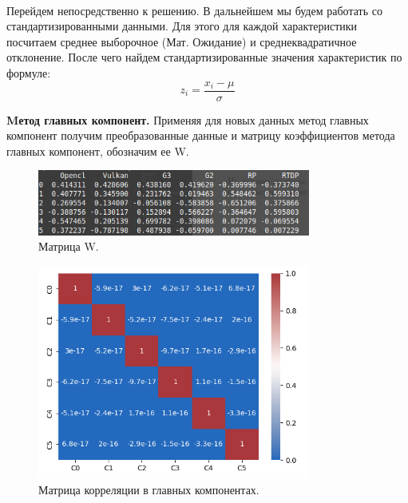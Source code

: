 \documentclass[14pt, a4paper]{extarticle}
\begin{document}
\paragraph{}
Перейдем непосредственно к решению. В дальнейшем мы будем работать со стандартизированными данными. Для этого для каждой характеристики посчитаем среднее выборочное (Мат. Ожидание) и среднеквадратичное отклонение.
После чего найдем стандартизированные значения характеристик по формуле:
\[
  z_i = \frac{x_i - \mu}{\sigma}
\]


\textbf{Mетод главных компонент.} Применяя для новых данных метод главных компонент получим преобразованные данные и матрицу коэффициентов метода главных компонент, обозначим ее {W}.
\newline

\begin{figure}[h]
  \centering
  \includegraphics[width=0.8\textwidth]{./img/linear/w-matrix.png}
  \caption{Матрица W.}
  \label{fig:example}
\end{figure}

\begin{figure}[h]
  \centering
  \includegraphics[width=0.8\textwidth]{./img/linear/psacorr.png}
  \caption{Матрица корреляции в главных компонентах.}
  \label{fig:example}
\end{figure}
\paragraph{}
\end{document}
